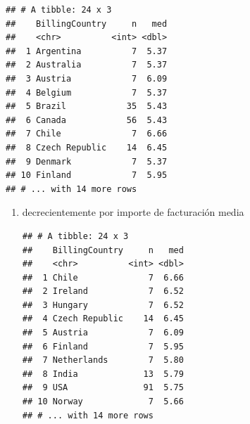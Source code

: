 \documentclass[
]{book}
\newenvironment{Shaded}{\begin{snugshade}}{\end{snugshade}}
\newcommand{\DataTypeTok}[1]{\textcolor[rgb]{0.13,0.29,0.53}{#1}}
\newcommand{\KeywordTok}[1]{\textcolor[rgb]{0.13,0.29,0.53}{\textbf{#1}}}
\newcommand{\NormalTok}[1]{#1}
\newcommand{\OperatorTok}[1]{\textcolor[rgb]{0.81,0.36,0.00}{\textbf{#1}}}
\newcommand{\OtherTok}[1]{\textcolor[rgb]{0.56,0.35,0.01}{#1}}
\newcommand{\StringTok}[1]{\textcolor[rgb]{0.31,0.60,0.02}{#1}}
\begin{document}
\begin{enumerate}
\begin{Shaded}
\end{Shaded}

\begin{verbatim}
## # A tibble: 24 x 3
##    BillingCountry     n   med
##    <chr>          <int> <dbl>
##  1 Argentina          7  5.37
##  2 Australia          7  5.37
##  3 Austria            7  6.09
##  4 Belgium            7  5.37
##  5 Brazil            35  5.43
##  6 Canada            56  5.43
##  7 Chile              7  6.66
##  8 Czech Republic    14  6.45
##  9 Denmark            7  5.37
## 10 Finland            7  5.95
## # ... with 14 more rows
\end{verbatim}
\end{enumerate}

\begin{enumerate}
\def\labelenumi{(\alph{enumi})}
\setcounter{enumi}{1}
\item
  decrecientemente por importe de facturación media

\begin{Shaded}
\end{Shaded}

\begin{verbatim}
## # A tibble: 24 x 3
##    BillingCountry     n   med
##    <chr>          <int> <dbl>
##  1 Chile              7  6.66
##  2 Ireland            7  6.52
##  3 Hungary            7  6.52
##  4 Czech Republic    14  6.45
##  5 Austria            7  6.09
##  6 Finland            7  5.95
##  7 Netherlands        7  5.80
##  8 India             13  5.79
##  9 USA               91  5.75
## 10 Norway             7  5.66
## # ... with 14 more rows
\end{verbatim}
\end{enumerate}
\end{document}
